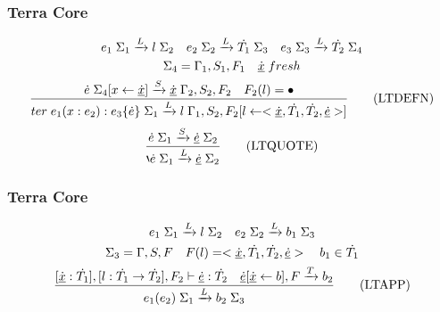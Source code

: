 \documentclass{beamer}
\begin{document}
\begin{frame}
  \frametitle{Terra Core}
  \begin{gather*}
    e_1 \thickspace \Sigma_1 \xrightarrow[]{L} l \thickspace \Sigma_2 \quad e_2 \thickspace \Sigma_2 \xrightarrow[]{L} \dot{T_1} \thickspace \Sigma_3 \quad e_3 \thickspace \Sigma_3 \xrightarrow[]{L} \dot{T_2} \thickspace \Sigma_4 \\
    \Sigma_4 = \Gamma_1, S_1, F_1 \quad \underline{\dot{x}} \thickspace fresh \\
    \frac{\dot{e} \thickspace \Sigma_4[x \leftarrow \underline{\dot{x}}] \xrightarrow[]{S} \underline{\dot{x}} \thickspace \Gamma_2, S_2, F_2 \quad F_2(l) = \bullet}{ter \thickspace e_1(x: e_2): e_3\{\dot{e}\} \thickspace \Sigma_1 \xrightarrow[]{L} l \thickspace \Gamma_1, S_2, F_2[l \leftarrow <\underline{\dot{x}}, \dot{T_1}, \dot{T_2}, \underline{\dot{e}}>]}\tag{LTDEFN}
  \end{gather*}
  \newline
  \begin{equation}
    \frac{\dot{e} \thickspace \Sigma_1 \xrightarrow[]{S} \underline{\dot{e}} \thickspace \Sigma_2}{\backprime{\dot{e}} \thickspace \Sigma_1 \xrightarrow[]{L} \underline{\dot{e}} \thickspace \Sigma_2}\tag{LTQUOTE}
  \end{equation}
\end{frame}

\begin{frame}
  \frametitle{Terra Core}
  \begin{gather*}
    e_1 \thickspace \Sigma_1 \xrightarrow[]{L} l \thickspace \Sigma_2 \quad e_2 \thickspace \Sigma_2 \xrightarrow[]{L} b_1 \thickspace \Sigma_3 \\
    \Sigma_3 = \Gamma, S, F \quad F(l) = <\underline{\dot{x}}, \dot{T_1}, \dot{T_2}, \underline{\dot{e}}> \quad b_1 \in \dot{T_1} \\
    \frac{[\underline{\dot{x}}: \dot{T_1}], [l: \dot{T_1} \rightarrow \dot{T_2}], F_2 \vdash \underline{\dot{e}}: \dot{T_2} \quad \underline{\dot{e}}[\underline{\dot{x}} \leftarrow b], F \xrightarrow[]{T} b_2}{e_1(e_2) \thickspace \Sigma_1 \xrightarrow[]{L} b_2 \thickspace \Sigma_3}\tag{LTAPP}
  \end{gather*}
\end{frame}
\end{document}
